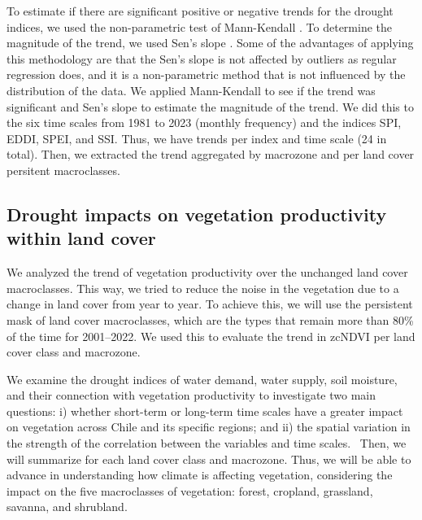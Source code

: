 \documentclass[
  authoryear,
  preprint,
  3p,
  onecolumn]{elsarticle}
\begin{document}
To estimate if there are significant positive or negative trends for the
drought indices, we used the non-parametric test of Mann-Kendall
\citep{Kendall1975}. To determine the magnitude of the trend, we used
Sen's slope \citep{Sen1968}. Some of the advantages of applying this
methodology are that the Sen's slope is not affected by outliers as
regular regression does, and it is a non-parametric method that is not
influenced by the distribution of the data. We applied Mann-Kendall to
see if the trend was significant and Sen's slope to estimate the
magnitude of the trend. We did this to the six time scales from 1981 to
2023 (monthly frequency) and the indices SPI, EDDI, SPEI, and SSI. Thus,
we have trends per index and time scale (24 in total). Then, we
extracted the trend aggregated by macrozone and per land cover persitent
macroclasses.

\hypertarget{drought-impacts-on-vegetation-productivity-within-land-cover}{%
\subsection{Drought impacts on vegetation productivity within land
cover}\label{drought-impacts-on-vegetation-productivity-within-land-cover}}

We analyzed the trend of vegetation productivity over the unchanged land
cover macroclasses. This way, we tried to reduce the noise in the
vegetation due to a change in land cover from year to year. To achieve
this, we will use the persistent mask of land cover macroclasses, which
are the types that remain more than 80\% of the time for 2001--2022. We
used this to evaluate the trend in zcNDVI per land cover class and
macrozone.

We examine the drought indices of water demand, water supply, soil
moisture, and their connection with vegetation productivity to
investigate two main questions: i) whether short-term or long-term time
scales have a greater impact on vegetation across Chile and its specific
regions; and ii) the spatial variation in the strength of the
correlation between the variables and time scales.~ Then, we will
summarize for each land cover class and macrozone. Thus, we will be able
to advance in understanding how climate is affecting vegetation,
considering the impact on the five macroclasses of vegetation: forest,
cropland, grassland, savanna, and shrubland.
\end{document}
